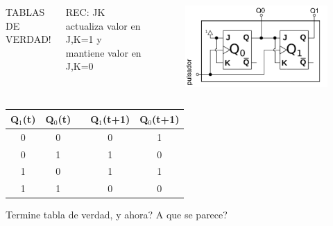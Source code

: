\documentclass[10pt]{beamer}
\begin{document}
\begin{frame}
{\begin{columns}
\begin{mdframed}[backgroundcolor=frenchblue!20]
  TABLAS DE VERDAD!
\end{mdframed}
\vspace{0.15cm}
REC: JK actualiza valor en J,K=1 y mantiene valor en J,K=0
\begin{figure}[h!]
    \centering
    \includegraphics[scale=0.23]{circuito.png}
\end{figure}
\end{columns}
\begin{table}[h!]
\begin{tabular}{|c|c|c|c|c|}
\hline
Q$_1$(t) & Q$_0$(t) &  & Q$_1$(t+1) & Q$_0$(t+1) \\ \hline
0        & 0        &  & 0          & 1          \\ \hline
0        & 1        &  & 1          & 0          \\ \hline
1        & 0        &  & 1          & 1          \\ \hline
1        & 1        &  & 0          & 0          \\ \hline
\end{tabular}
\end{table}
Termine tabla de verdad, y ahora? A que se parece?
}
\end{frame}
\end{document}
